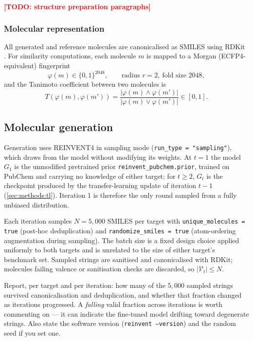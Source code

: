 \documentclass[11pt]{article}
\newcommand{\TODO}[1]{\textcolor{red}{\textbf{[TODO: #1]}}}
\newcommand{\Gmodel}{G}                         %
\newcommand{\Valid}{\mathcal{V}}                %
\newcommand{\fpr}{\varphi}                      %
\newcommand{\Tan}{T}                            %
\newcommand{\Ngen}{N}
\begin{document}
\TODO{structure preparation paragraphs}

\subsubsection{Molecular representation}

All generated and reference molecules are canonicalised as SMILES using
RDKit \citep{rdkit}. For similarity computations, each molecule $m$ is mapped
to a Morgan (ECFP4-equivalent) fingerprint \citep{rogers2010}
\begin{equation}
  \fpr(m) \in \{0,1\}^{2048},
  \qquad \text{radius } r = 2, \ \text{fold size } 2048,
  \label{eq:fp}
\end{equation}
and the Tanimoto coefficient between two molecules is
\begin{equation}
  \Tan\!\left(\fpr(m), \fpr(m')\right)
  = \frac{\left|\fpr(m) \wedge \fpr(m')\right|}
         {\left|\fpr(m) \vee \fpr(m')\right|} \in [0,1].
  \label{eq:tanimoto}
\end{equation}

\subsection{Molecular generation}
\label{sec:methods:gen}

Generation uses REINVENT4 \citep{loeffler2024} in sampling mode
(\texttt{run\_type = "sampling"}), which draws from the model without
modifying its weights. At $t=1$ the model $\Gmodel_1$ is the unmodified
pretrained prior \texttt{reinvent\_pubchem.prior}, trained on PubChem and
carrying no knowledge of either target; for $t \ge 2$, $\Gmodel_t$ is the
checkpoint produced by the transfer-learning update of iteration $t-1$
(\cref{sec:methods:tl}). Iteration 1 is therefore the only round sampled from a
fully unbiased distribution.

Each iteration samples $\Ngen = 5{,}000$ SMILES per target with
\texttt{unique\_molecules = true} (post-hoc deduplication) and
\texttt{randomize\_smiles = true} (atom-ordering augmentation during sampling).
The batch size is a fixed design choice applied uniformly to both targets and
is unrelated to the size of either target's benchmark set. Sampled strings are
sanitised and canonicalised with RDKit; molecules failing valence or
sanitisation checks are discarded, so $|\Valid_t| \le \Ngen$.

\begin{yourturn}
Report, per target and per iteration: how many of the $5{,}000$ sampled strings
survived canonicalisation and deduplication, and whether that fraction changed
as iterations progressed. A \emph{falling} valid fraction across iterations is
worth commenting on --- it can indicate the fine-tuned model drifting toward
degenerate strings. Also state the software version
(\texttt{reinvent --version}) and the random seed if you set one.
\end{yourturn}
\end{document}
